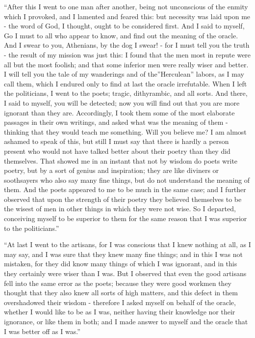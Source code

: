 \documentclass[
]{book}
\begin{document}
``After this I went to one man after another, being not unconscious of the enmity which I provoked, and I lamented and feared this: but necessity was laid upon me - the word of God, I thought, ought to be considered first. And I said to myself, Go I must to all who appear to know, and find out the meaning of the oracle. And I swear to you, Athenians, by the dog I swear! - for I must tell you the truth - the result of my mission was just this: I found that the men most in repute were all but the most foolish; and that some inferior men were really wiser and better. I will tell you the tale of my wanderings and of the''Herculean'' labors, as I may call them, which I endured only to find at last the oracle irrefutable. When I left the politicians, I went to the poets; tragic, dithyrambic, and all sorts. And there, I said to myself, you will be detected; now you will find out that you are more ignorant than they are. Accordingly, I took them some of the most elaborate passages in their own writings, and asked what was the meaning of them - thinking that they would teach me something. Will you believe me? I am almost ashamed to speak of this, but still I must say that there is hardly a person present who would not have talked better about their poetry than they did themselves. That showed me in an instant that not by wisdom do poets write poetry, but by a sort of genius and inspiration; they are like diviners or soothsayers who also say many fine things, but do not understand the meaning of them. And the poets appeared to me to be much in the same case; and I further observed that upon the strength of their poetry they believed themselves to be the wisest of men in other things in which they were not wise. So I departed, conceiving myself to be superior to them for the same reason that I was superior to the politicians.''

``At last I went to the artisans, for I was conscious that I knew nothing at all, as I may say, and I was sure that they knew many fine things; and in this I was not mistaken, for they did know many things of which I was ignorant, and in this they certainly were wiser than I was. But I observed that even the good artisans fell into the same error as the poets; because they were good workmen they thought that they also knew all sorts of high matters, and this defect in them overshadowed their wisdom - therefore I asked myself on behalf of the oracle, whether I would like to be as I was, neither having their knowledge nor their ignorance, or like them in both; and I made answer to myself and the oracle that I was better off as I was.''
\end{document}
